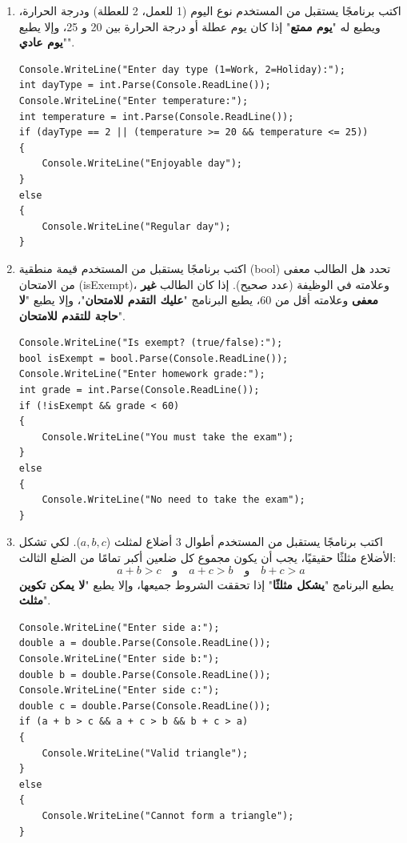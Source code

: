 \documentclass[14pt]{extarticle}
\begin{document}
\begin{enumerate}[resume, itemsep=2em]
\filbreak
\item
اكتب برنامجًا يستقبل من المستخدم نوع اليوم (1 للعمل، 2 للعطلة) ودرجة الحرارة، ويطبع له "\textbf{يوم ممتع}" إذا كان يوم عطلة أو درجة الحرارة بين 20 و 25، وإلا يطبع "\textbf{يوم عادي}".
\ifwithsols
\begin{boxSolution}
\begin{english}
\begin{verbatim}
Console.WriteLine("Enter day type (1=Work, 2=Holiday):");
int dayType = int.Parse(Console.ReadLine());
Console.WriteLine("Enter temperature:");
int temperature = int.Parse(Console.ReadLine());
if (dayType == 2 || (temperature >= 20 && temperature <= 25))
{
    Console.WriteLine("Enjoyable day");
}
else
{
    Console.WriteLine("Regular day");
}
\end{verbatim}
\end{english}
\end{boxSolution}
\fi

\filbreak
\item
اكتب برنامجًا يستقبل من المستخدم قيمة منطقية (\textenglish{bool}) تحدد هل الطالب معفى من الامتحان (\textenglish{isExempt})، وعلامته في الوظيفة (عدد صحيح). إذا كان الطالب \textbf{غير معفى} وعلامته أقل من 60، يطبع البرنامج "\textbf{عليك التقدم للامتحان}"، وإلا يطبع "\textbf{لا حاجة للتقدم للامتحان}".
\ifwithsols
\begin{boxSolution}
\begin{english}
\begin{verbatim}
Console.WriteLine("Is exempt? (true/false):");
bool isExempt = bool.Parse(Console.ReadLine());
Console.WriteLine("Enter homework grade:");
int grade = int.Parse(Console.ReadLine());
if (!isExempt && grade < 60)
{
    Console.WriteLine("You must take the exam");
}
else
{
    Console.WriteLine("No need to take the exam");
}
\end{verbatim}
\end{english}
\end{boxSolution}
\fi

\filbreak
\item
اكتب برنامجًا يستقبل من المستخدم أطوال 3 أضلاع لمثلث ($a, b, c$). لكي تشكل الأضلاع مثلثًا حقيقيًا، يجب أن يكون مجموع كل ضلعين أكبر تمامًا من الضلع الثالث:
$$ a + b > c \quad \text{و} \quad a + c > b \quad \text{و} \quad b + c > a $$
يطبع البرنامج "\textbf{يشكل مثلثًا}" إذا تحققت الشروط جميعها، وإلا يطبع "\textbf{لا يمكن تكوين مثلث}".
\ifwithsols
\begin{boxSolution}
\begin{english}
\begin{verbatim}
Console.WriteLine("Enter side a:");
double a = double.Parse(Console.ReadLine());
Console.WriteLine("Enter side b:");
double b = double.Parse(Console.ReadLine());
Console.WriteLine("Enter side c:");
double c = double.Parse(Console.ReadLine());
if (a + b > c && a + c > b && b + c > a)
{
    Console.WriteLine("Valid triangle");
}
else
{
    Console.WriteLine("Cannot form a triangle");
}
\end{verbatim}
\end{english}
\end{boxSolution}
\fi


\end{enumerate}
\end{document}
